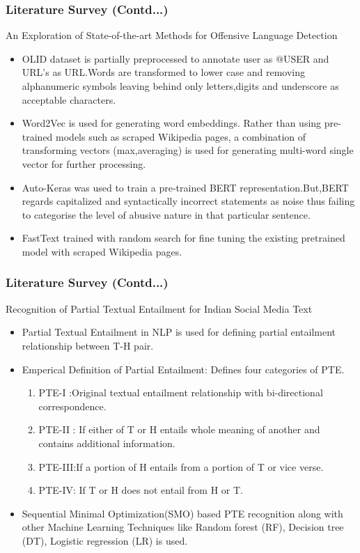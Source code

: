 \documentclass{beamer}
\begin{document}
\begin{frame}\frametitle{Literature Survey (Contd...)}
    An Exploration of State-of-the-art Methods for Offensive Language Detection\cite{stateofartSemEvalT6}
    \begin{itemize}
    	\item OLID dataset is partially preprocessed to annotate user as @USER and URL's as URL.Words are transformed to lower case and removing alphanumeric symbols leaving behind only letters,digits and underscore as acceptable characters.
\item Word2Vec is used for generating word embeddings. Rather than using pre-trained models such as scraped Wikipedia pages,  a combination of transforming vectors (max,averaging) is used for generating multi-word single vector for further processing.
\item  Auto-Keras was used to train a pre-trained BERT representation.But,BERT regards capitalized and syntactically incorrect statements as noise thus failing to categorise the level of abusive nature in that particular sentence.
\item FastText trained with random search for fine tuning the existing pretrained model with scraped Wikipedia pages.
 
    \end{itemize}
\end{frame}


\begin{frame}\frametitle{Literature Survey (Contd...)}
   Recognition of Partial Textual Entailment for Indian Social Media Text\cite{partialTESocial}
    \begin{itemize}
\item Partial Textual Entailment in NLP is used for defining partial entailment relationship between T-H pair.
\item Emperical Definition of Partial Entailment:
Defines four categories of PTE.
\begin{enumerate}
	\item PTE-I :Original textual entailment relationship with bi-directional correspondence.
	\item PTE-II : If either of T or H entails whole meaning of another and contains additional information.
	\item PTE-III:If a portion of H entails from a portion
	of T or vice verse.
	\item PTE-IV: If T or H does not entail from H or T. 
\end{enumerate}
\item Sequential Minimal Optimization(SMO) based PTE recognition along with other Machine Learning Techniques like Random forest (RF), Decision tree (DT), Logistic regression (LR) is used.
    \end{itemize}
\end{frame}
\end{document}
